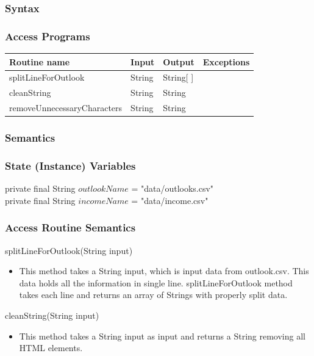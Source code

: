 \documentclass[12pt,fleqn]{article}
\begin{document}
\subsubsection* {Syntax}

\subsubsection* {Access Programs}
\begin{tabular}{| l | l | l | l |}
\hline
\textbf{Routine name} & \textbf{Input} & \textbf{Output} & \textbf{Exceptions}\\
\hline
splitLineForOutlook & String & String[ ] & ~\\
\hline
cleanString & String & String & ~\\
\hline
removeUnnecessaryCharacters & String & String & ~\\
\hline
\end{tabular}

\subsubsection*{Semantics}
\subsubsection*{State (Instance) Variables}
	private final String $outlookName$ = "data/outlooks.csv"\\
	private final String $incomeName$ = "data/income.csv"\\

\subsubsection*{Access Routine Semantics}

\noindent splitLineForOutlook(String input)
\begin{itemize}
\item This method takes a String input, which is input data from outlook.csv. This data holds all the information in single line. splitLineForOutlook method takes each line and returns an array of Strings with properly split data.
\end{itemize}

\noindent cleanString(String input)
\begin{itemize}
\item This method takes a String input as input and returns a String removing all HTML elements.
\end{itemize}
\end{document}
